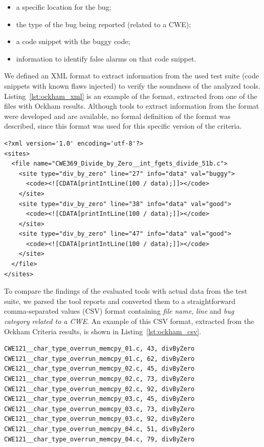 \begin{itemize}
\item a specific location for the bug;
\item the type of the bug being reported (related to a CWE);
\item a code snippet with the buggy code;
\item information to identify false alarms on that code snippet.
\end{itemize}

We defined an XML format to extract information from the used test suite (code
snippets with known flaws injected) to verify the soundness of the analyzed
tools. Listing~\ref{lst:ockham_xml} is an example of the format, extracted from
one of the files with Ockham results.  Although tools to extract information
from the format were developed and are available, no formal definition of the
format was described, since this format was used for this specific version of
the criteria.

\begin{minipage}{\linewidth}
\begin{lstlisting}[frame=none, caption={Ockham Criteria XML bug report example},label={lst:ockham_xml}]
<?xml version='1.0' encoding='utf-8'?>
<sites>
  <file name="CWE369_Divide_by_Zero__int_fgets_divide_51b.c">
    <site type="div_by_zero" line="27" info="data" val="buggy">
      <code><![CDATA[printIntLine(100 / data);]]></code>
    </site>
    <site type="div_by_zero" line="38" info="data" val="good">
      <code><![CDATA[printIntLine(100 / data);]]></code>
    </site>
    <site type="div_by_zero" line="47" info="data" val="good">
      <code><![CDATA[printIntLine(100 / data);]]></code>
    </site>
  </file>
</sites>
\end{lstlisting}
\end{minipage}

To compare the findings of the evaluated tools with actual data from the test suite, we parsed
the tool reports and converted them to a straightforward comma-separated values
(CSV) format containing \textit{file name}, \textit{line} and \textit{bug category
related to a CWE}. An example of this CSV format, extracted from the Ockham
Criteria results, is shown in Listing~\ref{lst:ockham_csv}.

\begin{minipage}{\linewidth}
\lstset{language=Python}
\begin{lstlisting}[frame=none, caption={Ockham Criteria CSV bug report example},label={lst:ockham_csv}]
CWE121__char_type_overrun_memcpy_01.c, 43, divByZero
CWE121__char_type_overrun_memcpy_01.c, 62, divByZero
CWE121__char_type_overrun_memcpy_02.c, 45, divByZero
CWE121__char_type_overrun_memcpy_02.c, 73, divByZero
CWE121__char_type_overrun_memcpy_02.c, 92, divByZero
CWE121__char_type_overrun_memcpy_03.c, 45, divByZero
CWE121__char_type_overrun_memcpy_03.c, 73, divByZero
CWE121__char_type_overrun_memcpy_03.c, 92, divByZero
CWE121__char_type_overrun_memcpy_04.c, 51, divByZero
CWE121__char_type_overrun_memcpy_04.c, 79, divByZero
\end{lstlisting}
\end{minipage}

